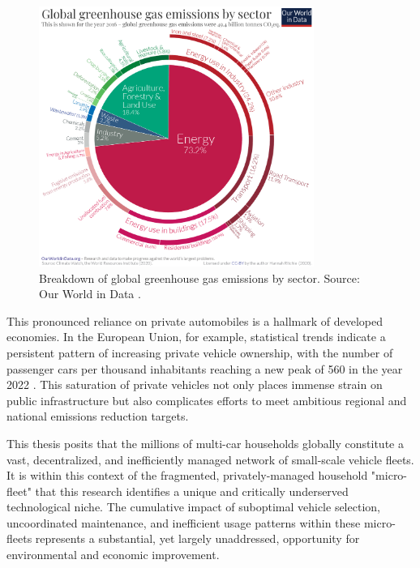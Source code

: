 \begin{figure}[H]
\centering
\includegraphics[width=0.8\textwidth]{images/ghg-emissions-by-sector.png}
\caption{Breakdown of global greenhouse gas emissions by sector. Source: Our World in Data \cite{owid-ghg-emissions-by-sector}.}
\label{fig:ghg-emissions-by-sector-pie-chart}
\end{figure}

\textgap

This pronounced reliance on private automobiles is a hallmark of developed economies. In the European Union, for example, statistical trends indicate a persistent pattern of increasing private vehicle ownership, with the number of passenger cars per thousand inhabitants reaching a new peak of 560 in the year 2022 \cite{passengers-cars-per-thousand-people}. This saturation of private vehicles not only places immense strain on public infrastructure but also complicates efforts to meet ambitious regional and national emissions reduction targets.

\textgap

This thesis posits that the millions of multi-car households globally constitute a vast, decentralized, and inefficiently managed network of small-scale vehicle fleets. It is within this context of the fragmented, privately-managed household "micro-fleet" that this research identifies a unique and critically underserved technological niche. The cumulative impact of suboptimal vehicle selection, uncoordinated maintenance, and inefficient usage patterns within these micro-fleets represents a substantial, yet largely unaddressed, opportunity for environmental and economic improvement.

